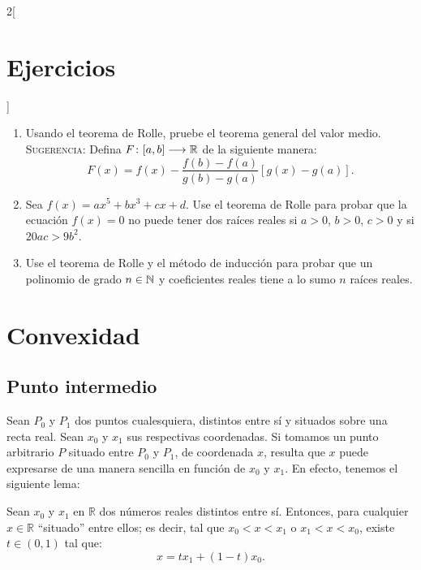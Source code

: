 \begin{multicols}{2}[\section{Ejercicios}]
\begin{enumerate}[leftmargin=*]
\item Usando el teorema de Rolle, pruebe el teorema general del valor medio.
    \textsc{Sugerencia:} Defina $F\colon [a,b]\longrightarrow \mathbb{R}$ de la siguiente manera:
    \[
      F(x) = f(x) - \frac{f(b) - f(a)}{g(b) - g(a)}[g(x) - g(a)].
    \]

\item Sea $f(x) = ax^5 + bx^3 + cx + d$. Use el teorema de Rolle para probar que la ecuación
    $f(x) = 0$ no puede tener dos raíces reales si $a > 0$, $b > 0$, $c > 0$ y si $20ac>9b^2$.

\item Use el teorema de Rolle y el método de inducción para probar que un polinomio de grado
    $n\in\mathbb{N}$ y coeficientes reales tiene a lo sumo $n$ raíces reales.
\end{enumerate}
\endgroup
\end{multicols}

\section{Convexidad}

\subsection{Punto intermedio}

Sean $P_{0}$ y  $P_{1}$ dos puntos cualesquiera, distintos entre sí y situados sobre una recta
real. Sean  $x_{0}$ y  $x_{1}$ sus respectivas coordenadas. Si tomamos un punto arbitrario $P$
situado entre $P_{0}$ y  $P_{1}$, de coordenada $x$, resulta que $x$ puede expresarse de una manera
sencilla en función de $x_{0}$  y  $x_{1}$. En efecto, tenemos el siguiente lema:

\begin{lemacal}
Sean $x_{0}$  y  $x_{1}$ en $\mathbb{R}$ dos números reales distintos entre sí. Entonces, para
cualquier $x\in \mathbb{R}$ ``situado'' entre ellos; es decir, tal que $x_0 < x < x_1$ o $x_1 < x <
x_0$, existe $t\in (0,1)$ tal que:
\begin{equation}
\label{eq:algeom001}
x=tx_{1}+(1-t)x_{0}.
\end{equation}
\end{lemacal}

